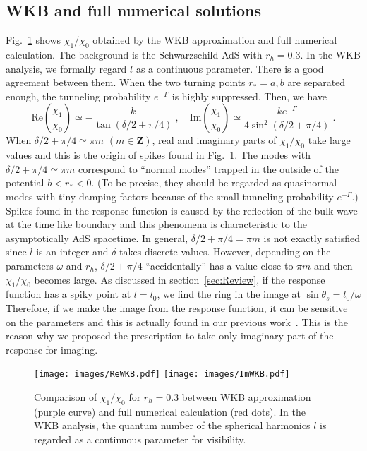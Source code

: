 \documentclass[a4paper,11pt]{article}
\begin{document}
\subsection{WKB and full numerical solutions}
\label{WKBfull}

    Fig.~\ref{ReImWKB} shows $\chi_1/\chi_0$ obtained by the WKB approximation and full numerical calculation.
    The background is the Schwarzschild-AdS with $r_h=0.3$.
    In the WKB analysis, we formally regard $l$ as a continuous parameter. There is a good agreement between them.
    When the two turning points $r_\ast=a,b$ are separated enough, the tunneling probability $e^{-\Gamma}$ is highly suppressed. 
    Then, we have
    \begin{equation}
        \textrm{Re}\left(\frac{\chi_1}{\chi_0}\right)\simeq -\frac{k}{\tan(\delta/2+\pi/4)}\ ,\quad 
        \textrm{Im}\left(\frac{\chi_1}{\chi_0}\right)\simeq \frac{k e^{-\Gamma}}{4 \sin^2 (\delta/2+\pi/4)}\ .
        \label{ReIm}
    \end{equation}
    When $\delta/2+\pi/4 \simeq \pi m$ $(m\in \bm{Z})$, real and imaginary parts of $\chi_1/\chi_0$ take large values 
    and this is the origin of spikes found in Fig.~\ref{ReImWKB}.
    The modes with $\delta/2+\pi/4 \simeq \pi m$ correspond to 
    ``normal modes'' trapped in the outside of the potential $b<r_\ast<0$. 
    (To be precise, they should be regarded as quasinormal modes with tiny damping factors because of the 
    small tunneling probability $e^{-\Gamma}$.) 
    Spikes found in the response function is caused by the reflection of the bulk wave at the time like boundary and this phenomena is characteristic to the asymptotically AdS spacetime.
    In general, $\delta/2+\pi/4 = \pi m$ is not exactly satisfied since $l$ is an integer and $\delta$ takes discrete values.
    However, depending on the parameters $\omega$ and $r_h$, $\delta/2+\pi/4$ ``accidentally'' has a  value close to $\pi m$ and then $\chi_1/\chi_0$ becomes large.
    As discussed in section~\ref{sec:Review}, if the response function has a spiky point at $l=l_0$, we find the ring in the image at $\sin\theta_s = l_0/\omega$
    Therefore, if we make the image from the response function, 
    it can be sensitive on the parameters and this is actually found in our previous work~\cite{Hashimoto:2018okj,Hashimoto:2019jmw}. 
    This is the reason why we proposed the prescription to take only imaginary part of the response for imaging.

    \begin{figure}
        \centering
        \subfigure
         {\texttt{[image: images/ReWKB.pdf]}\label{ReWKB}
          }
          \subfigure
         {\texttt{[image: images/ImWKB.pdf]}\label{ImWKB}
          }
         \caption{
        Comparison of $\chi_1/\chi_0$ for $r_h=0.3$
        between WKB approximation (purple curve) and full numerical calculation (red dots).
        In the WKB analysis, the quantum number of the spherical harmonics $l$ is regarded as a continuous parameter for visibility.
        }
        \label{ReImWKB}
    \end{figure}
\end{document}
